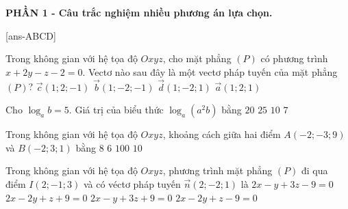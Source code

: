 \def\thoigian{90}%



\begin{center}
	\textbf{PHẦN 1 - Câu trắc nghiệm nhiều phương án lựa chọn.}
\end{center}
\setcounter{ex}{0}

[ans-ABCD]




\begin{ex}%
	Trong không gian với hệ tọa độ $Oxyz$, cho mặt phẳng $(P)$ có phương trình $x+2y-z-2=0$. Vectơ nào sau đây là một vectơ pháp tuyến của mặt phẳng $(P)$?
	\choice
	{\True $\overrightarrow{c}(1;2;-1)$}
	{$\overrightarrow{b}(1;-2;-1)$}
	{$\overrightarrow{d}(1;-2;1)$}
	{$\overrightarrow{a}(1;2;1)$}
\end{ex}
\begin{ex}%
	Cho $\log_ab=5$. Giá trị của biểu thức $\log_a\left(a^2b\right)$ bằng
	\choice
	{$20$}
	{$25$}
	{$10$}
	{\True $7$}
\end{ex}
\begin{ex}%
	Trong không gian với hệ tọa độ $Oxyz$, khoảng cách giữa hai điểm $A(-2;-3;9)$ và $B(-2;3;1)$ bằng
	\choice
	{$8$}
	{$6$}
	{$100$}
	{\True $10$}
\end{ex}
\begin{ex}%
	Trong không gian với hệ tọa độ $Oxyz$, phương trình mặt phẳng $(P)$ đi qua điểm $I(2;-1;3)$ và có véctơ pháp tuyến $\overrightarrow{n}(2;-2;1)$ là
	\choice
	{$2x-y+3z-9=0$}
	{$2x-2y+z+9=0$}
	{$2x-y+3z+9=0$}
	{\True $2x-2y+z-9=0$}
\end{ex}
